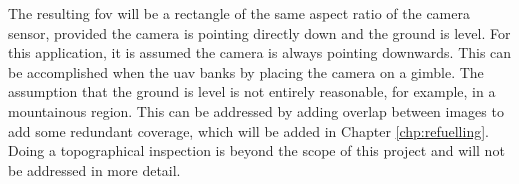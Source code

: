 The resulting \acl{fov} will be a rectangle of the same aspect ratio of the camera sensor, provided the camera is pointing directly down and the ground is level. For this application, it is assumed the camera is always pointing downwards. This can be accomplished when the \acs{uav} banks by placing the camera on a gimble. The assumption that the ground is level is not entirely reasonable, for example, in a mountainous region. This can be addressed by adding overlap between images to add some redundant coverage, which will be added in Chapter \ref{chp:refuelling}. Doing a topographical inspection is beyond the scope of this project and will not be addressed in more detail.
\begin{figure}[h!]
	\centering	      
	\begin{tikzpicture}[x=0.75pt,y=0.75pt,yscale=-1,xscale=1]
		

\end{tikzpicture}
\end{figure}
